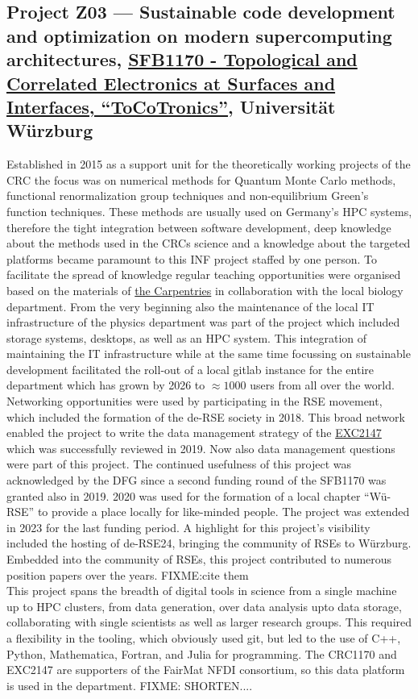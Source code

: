 \documentclass{eceasst}
\begin{document}
\subsection{Project Z03 --- Sustainable code development and optimization on modern supercomputing architectures, \href{https://gepris.dfg.de/gepris/projekt/258499086?language=en}{SFB1170 - Topological and Correlated Electronics at Surfaces and Interfaces, ``ToCoTronics''}, Universität Würzburg}
Established in 2015 as a support unit for the theoretically working projects of the CRC the focus was on numerical methods for Quantum Monte Carlo methods, functional renormalization group techniques and non-equilibrium Green's function techniques. These methods are usually used on
Germany's HPC systems, therefore the tight integration between software development, deep knowledge about the methods used in the CRCs science and a knowledge about the targeted platforms became paramount to this INF project staffed by one person.
To facilitate the spread of knowledge regular teaching opportunities were organised based on the materials of \href{https://carpentries.org/}{the Carpentries} in collaboration with the local biology department.
From the very beginning also the maintenance of the local IT infrastructure of the physics department was part of the project which included
storage systems, desktops, as well as an HPC system.
This integration of maintaining the IT infrastructure while at the same time focussing on sustainable development
facilitated the roll-out of a local gitlab instance for the entire department which has grown by 2026 to $\approx 1000$ users from all
over the world. Networking opportunities were used by participating in the RSE movement, which included the formation of the de-RSE society in 2018. This broad network enabled the project to write the data management strategy of the \href{https://www.ctdqmat.de/}{EXC2147} which was successfully reviewed in 2019.
Now also data management questions were part of this project.
The continued usefulness of this project was acknowledged by the DFG since a second funding round of the SFB1170 was granted also in 2019.
2020 was used for the formation of a local chapter ``Wü-RSE'' to provide a place
locally for like-minded people. The project was extended in 2023 for the last funding period. A highlight for this project's visibility included the hosting of de-RSE24, bringing the community of RSEs to Würzburg. Embedded into the community of RSEs, this project contributed
to numerous position papers over the years. FIXME:cite them\\
This project spans the breadth of digital tools in science from a single machine up to HPC clusters, from data generation, over data analysis upto data storage, collaborating with single scientists as well as larger research groups. This required a flexibility in the tooling, which obviously used git, but led to the use of C++, Python, Mathematica, Fortran, and Julia for programming. The CRC1170 and EXC2147 are supporters of the FairMat NFDI consortium, so this data platform is used in the department.
FIXME: SHORTEN....
\end{document}
